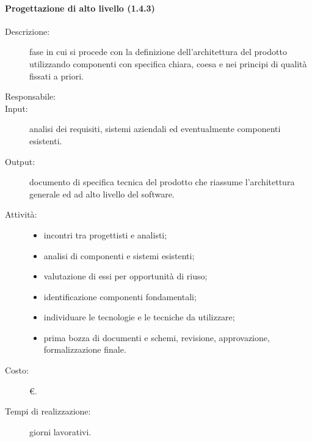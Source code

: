 \paragraph{Progettazione di alto livello (1.4.3)}
\begin{description}
\item[Descrizione:] fase in cui si procede con la definizione dell'architettura del prodotto utilizzando componenti con
specifica chiara, coesa e nei principi di qualità fissati a priori.
\item[Responsabile:] 
\item[Input:] analisi dei requisiti, sistemi aziendali ed eventualmente componenti esistenti.
\item[Output:] documento di specifica tecnica del prodotto che riassume l'architettura generale ed ad
alto livello del software.
\item[Attività:]
\begin{itemize}
\item incontri tra progettisti e analisti;
\item analisi di componenti e sistemi esistenti;
\item valutazione di essi per opportunità di riuso;
\item identificazione componenti fondamentali;
\item individuare le tecnologie e le tecniche da utilizzare;
\item prima bozza di documenti e schemi, revisione, approvazione, formalizzazione finale.
\end{itemize}
\item[Costo:] \euro{}.
\item[Tempi di realizzazione:]  giorni lavorativi.
\end{description}

